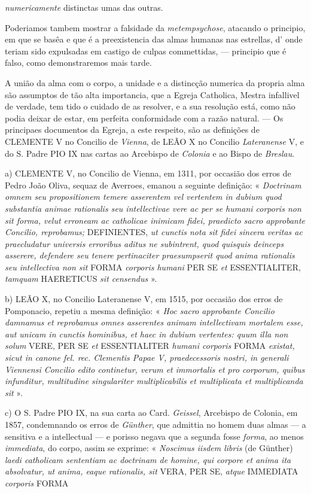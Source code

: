 \emph{numericamente} distinctas umas das outras.\par Poderiamos tambem mostrar a falsidade da \emph{metempsychose}, atacando o principio, em que se basêa e que é a preexistencia das almas humanas nas estrellas, d' onde teriam sido expulsadas em castigo de culpas commettidas, --- principio que é falso, como demonstraremos mais tarde.\par *\par A união da alma com o corpo, a unidade e a distincção numerica da propria alma são assumptos de tão alta importancia, que a Egreja Catholica, Mestra infallivel de verdade, tem tido o cuidado de as resolver, e a sua resolução está, como não podia deixar de estar, em perfeita conformidade com a razão natural. --- Os principaes documentos da Egreja, a este respeito, são as definições de \textsc{CLEMENTE} V no Concilio de \emph{Vienna}, de \textsc{LEÃO} X no Concilio \emph{Lateranense} V, e do S. Padre \textsc{PIO} IX nas cartas ao Arcebispo de \emph{Colonia} e ao Bispo de \emph{Breslau}.\par a) \textsc{CLEMENTE} V, no Concilio de Vienna, em 1311, por occasião dos erros de Pedro João Oliva, sequaz de Averroes, emanou a seguinte definição: « \emph{Doctrinam omnem seu propositionem temere asserentem vel vertentem in dubium quod substantia animae rationalis seu intellectivae vere ac per se humani corporis non sit forma, velut erroneam ac catholicae inimicam fidei, praedicto sacro approbante Concilio, reprobamus;} \textsc{DEFINIENTES}, \emph{ut cunctis nota sit fidei sincera veritas ac praecludatur universis erroribus aditus ne subintrent, quod quisquis deinceps asserere, defendere seu tenere pertinaciter praesumpserit quod anima rationalis seu intellectiva non sit} \textsc{FORMA} \emph{corporis humani} \textsc{PER SE} \emph{et} \textsc{ESSENTIALITER}, \emph{tamquam} \textsc{HAERETICUS} \emph{sit censendus} ».\par b) \textsc{LEÃO} X, no Concilio Lateranense V, em 1515, por occasião dos erros de Pomponacio, repetiu a mesma definição: « \emph{Hoc sacro approbante Concilio damnamus et reprobamus omnes asserentes animam intellectivam mortalem esse, aut unicam in cunctis hominibus, et haec in dubium vertentes: quum illa non solum} \textsc{VERE}, \textsc{PER SE} \emph{et} \textsc{ESSENTIALITER} \emph{humani corporis} \textsc{FORMA} \emph{existat, sicut in canone fel. rec. Clementis Papae V, praedecessoris nostri, in generali Viennensi Concilio edito continetur, verum et immortalis et pro corporum, quibus infunditur, multitudine singulariter multiplicabilis et multiplicata et multiplicanda sit} ».\par c) O S. Padre \textsc{PIO} IX, na sua carta ao Card. \emph{Geissel}, Arcebispo de Colonia, em 1857, condemnando os erros de \emph{Günther}, que admittia no homem duas almas --- a sensitiva e a intellectual --- e porisso negava que a segunda fosse \emph{forma}, ao menos \emph{immediata}, do corpo, assim se exprime: « \emph{Noscimus iisdem libris} (de Günther) \emph{laedi catholicam sententiam ac doctrinam de homine, qui corpore et anima ita absolvatur, ut anima, eaque rationalis, sit} \textsc{VERA}, \textsc{PER SE}, \emph{atque} \textsc{IMMEDIATA} \emph{corporis} \textsc{FORMA} 